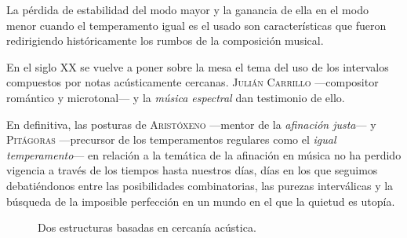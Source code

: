 \documentclass[a4paper,10pt]{article}
\begin{document}
\begin{multicols}{2}
  La pérdida de estabilidad del modo mayor y la ganancia de ella en el modo menor cuando el temperamento igual es el usado son características que fueron redirigiendo históricamente los rumbos de la composición musical.

  En el siglo XX se vuelve a poner sobre la mesa el tema del uso de los intervalos compuestos por notas acústicamente cercanas. \textsc{Julián Carrillo} ---compositor romántico y microtonal--- y la \emph{música espectral} dan testimonio de ello.

  En definitiva, las posturas de \textsc{Aristóxeno} ---mentor de la \emph{afinación justa}--- y \textsc{Pitágoras} ---precursor de los temperamentos regulares como el \emph{igual temperamento}--- en relación a la temática de la afinación en música no ha perdido vigencia a través de los tiempos hasta nuestros días, días en los que seguimos debatiéndonos entre las posibilidades combinatorias, las purezas interválicas y la búsqueda de la imposible perfección en un mundo en el que la quietud es utopía.
\end{multicols}

\begin{figure}[ht]
\centering
{}
\caption{Dos estructuras basadas en cercanía acústica.}\label{fig:dos-estructuras}
\end{figure}
\end{document}
